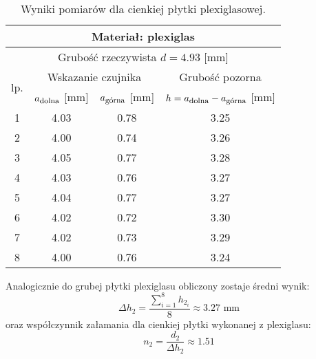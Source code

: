\documentclass[a4paper,12pts]{article}
\begin{document}
		\begin{table}[!h]
		\centering
		\begin{tabular}{| c | c | c | c |}
			\hline
			\multicolumn{4}{|c|}{Materiał: plexiglas}  \\ \hline
			\multicolumn{4}{|c|}{Grubość rzeczywista $d = 4.93$ [mm] } \\ \hline
			\multirow{2}{*}{lp.} & \multicolumn{2}{|c|}{Wskazanie czujnika} & Grubość pozorna \\ \cline{2-4}
			& $a_{\textrm{\footnotesize dolna}}$ [mm] & $a_{\textrm{\footnotesize górna}}$ [mm] & $h = a_{\textrm{\footnotesize dolna}} - a_{\textrm{\footnotesize górna}}$ [mm] \\ \hline
			1  & 4.03 & 0.78 & 3.25 \\ \hline
			2  & 4.00 & 0.74 & 3.26 \\ \hline
			3  & 4.05 & 0.77 & 3.28 \\ \hline
			4  & 4.03 & 0.76 & 3.27 \\ \hline
			5  & 4.04 & 0.77 & 3.27 \\ \hline
			6  & 4.02 & 0.72 & 3.30 \\ \hline
			7  & 4.02 & 0.73 & 3.29 \\ \hline
			8  & 4.00 & 0.76 & 3.24 \\ \hline
		\end{tabular}
		\caption{Wyniki pomiarów dla cienkiej płytki plexiglasowej.}
		\label{chudy_pleksi}
	\end{table}
	
	Analogicznie do grubej płytki plexiglasu obliczony zostaje średni wynik: 
	\begin{equation}
		\Delta h_2 = \frac{\sum_{i = 1}^{8} h_{2_i}}{8} \approx 3.27 \textrm{ mm}
	\end{equation}
	oraz współczynnik załamania dla cienkiej płytki wykonanej z plexiglasu:
		\begin{equation}
	n_2 = \frac{d_2}{\Delta h_2} \approx 1.51
	\end{equation}
	
\end{document}
